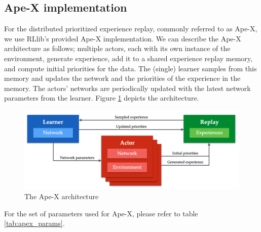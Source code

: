 \documentclass[12pt,a4paper]{article}
\begin{document}
\subsection{Ape-X implementation}
For the distributed prioritized experience replay, commonly referred to as Ape-X, we use RLlib's provided Ape-X implementation.
We can describe the Ape-X architecture as follows; multiple actors, each with its own instance of the environment,
generate experience, add it to a shared experience replay memory, and compute initial priorities for the data.
The (single) learner samples from this memory and updates the network and the priorities of the experience in
the memory. The actors’ networks are periodically updated with the latest network parameters from the learner. Figure \ref{fig:apexnutshell} depicts the architecture.
\begin{figure}
    \centering
    \includegraphics[width=\linewidth]{Figures/apexnutshell.png}
    \caption{The Ape-X architecture \cite{DBLP:journals/corr/abs-1803-00933}}
    \label{fig:apexnutshell}
\end{figure}
For the set of parameters used for Ape-X, please refer to table \ref{tab:apex_params}.
\end{document}
